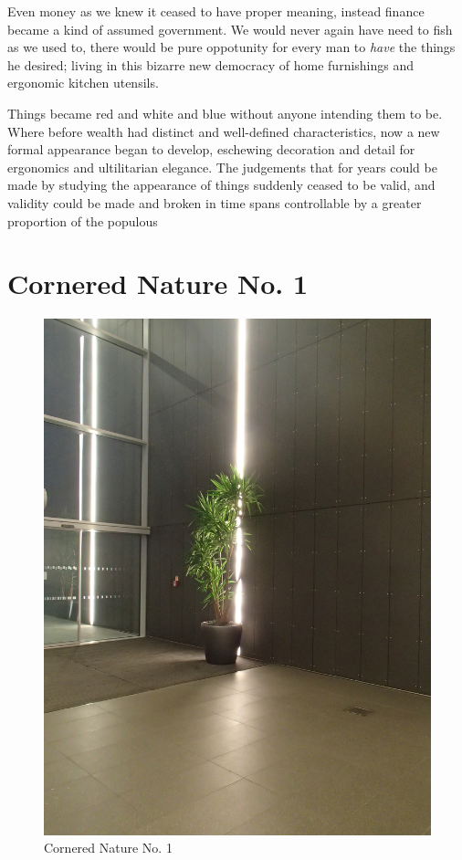\documentclass{book}
\begin{document}
Even money as we knew it ceased to have proper meaning, instead finance became
a kind of assumed government. We would never again have need to fish as we used
to, there would be pure oppotunity for every man to \emph{have} the things he
desired; living in this bizarre new democracy of home furnishings and ergonomic
kitchen utensils.

Things became red and white and blue without anyone intending them to be. Where
before wealth had distinct and well-defined characteristics, now a new formal
appearance began to develop, eschewing decoration and detail for ergonomics and
ultilitarian elegance. The judgements that for years could be made by studying
the appearance of things suddenly ceased to be valid, and validity could be
made and broken in time spans controllable by a greater proportion of the
populous

\chapter{Cornered Nature No. 1}

\begin{figure}
\centering
\includegraphics[width=\textwidth,angle=-90]{figures/P1050156.JPG}
\caption{Cornered Nature No. 1}
\end{figure}
\end{document}
